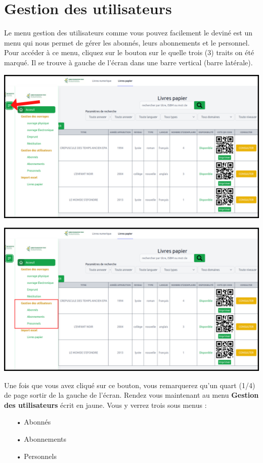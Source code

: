 \documentclass[12pt,a4paper]{article}
\begin{document}
\section{Gestion des utilisateurs}
Le menu gestion des utilisateurs comme vous pouvez facilement le deviné est un menu qui
nous permet de gérer les abonnés, leurs abonnements et le personnel. 
Pour accéder à ce menu, cliquez sur le bouton sur le quelle trois (3) traits on été marqué. 
Il se trouve à gauche de l'écran dans une barre vertical (barre latérale). \\

\begin{center}
\includegraphics[scale=0.5]{img/sidebar.png}
\end{center}

\begin{center}
\includegraphics[scale=0.5]{img/gestion_utilisateurs.png}
\end{center}

Une fois que vous avez cliqué sur ce bouton, vous remarquerez qu'un quart (1/4) de page 
sortir de la gauche de l'écran. Rendez vous maintenant au menu \textbf{Gestion des
utilisateurs} écrit en jaune. Vous y verrez trois sous menus :
\begin{itemize}
\item[•] Abonnés
\item[•] Abonnements
\item[•] Personnels
\end{itemize}
\end{document}
